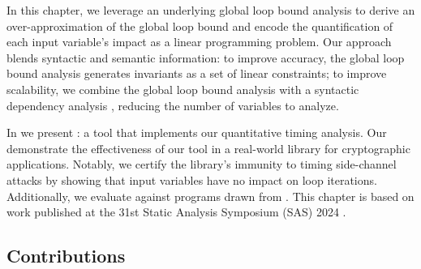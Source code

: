 In this chapter, we leverage an underlying global loop bound analysis to derive an over-approximation of the global loop bound and encode the quantification of each input variable's impact as a linear programming problem.
Our approach blends syntactic and semantic information:
to improve accuracy, the global loop bound analysis generates invariants as a set of linear constraints;
to improve scalability, we combine the global loop bound analysis with a syntactic dependency analysis , reducing the number of variables to analyze.

In  we present \timesec: a tool that implements our quantitative timing analysis. Our demonstrate the effectiveness of our tool in a real-world library for cryptographic applications. Notably, we certify the library's immunity to timing side-channel attacks by showing that input variables have no impact on loop iterations. Additionally, we evaluate \timesec{} against programs drawn from \svcomp.
This chapter is based on work published at the 31st Static Analysis Symposium (SAS) 2024 .

\subsection{Contributions}

